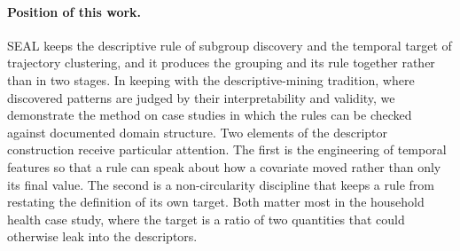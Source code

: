 \paragraph{Position of this work.} SEAL keeps the descriptive rule of subgroup discovery and the temporal target of trajectory clustering, and it produces the grouping and its rule together rather than in two stages. In keeping with the descriptive-mining tradition, where discovered patterns are judged by their interpretability and validity, we demonstrate the method on case studies in which the rules can be checked against documented domain structure. Two elements of the descriptor construction receive particular attention. The first is the engineering of temporal features so that a rule can speak about how a covariate moved rather than only its final value. The second is a non-circularity discipline that keeps a rule from restating the definition of its own target. Both matter most in the household health case study, where the target is a ratio of two quantities that could otherwise leak into the descriptors.
